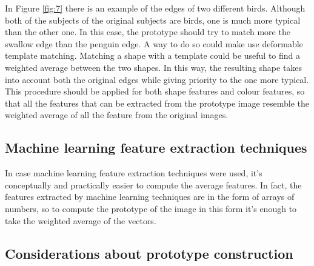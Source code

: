 \documentclass[conference]{IEEEtran}
\begin{document}
		\noindent In Figure \ref{fig:7} there is an example of the edges of two different birds. Although both of the subjects of the original 
		subjects are birds, one is much more typical than the other one. In this case, the prototype should try to match more the swallow edge than the penguin edge. A way to do so could make use deformable 
		template matching. Matching a shape with a template could be useful to find a weighted average between the two shapes. In this way, the resulting shape takes into account both the original edges while 
		giving priority to the one more typical.
		This procedure should be applied for both shape features and colour features, so that all the features that can be extracted from the prototype image resemble the weighted average of all the feature from 
		the original images. 

		\subsection{Machine learning feature extraction techniques}
		
			In case machine learning feature extraction techniques were used, it's conceptually and practically easier to compute the average features. In fact, the features extracted by machine learning techniques are 
			in the form of arrays of numbers, so to compute the prototype of the image in this form it's enough to take the weighted average of the vectors.
		
		\subsection{Considerations about prototype construction}
		
\end{document}
